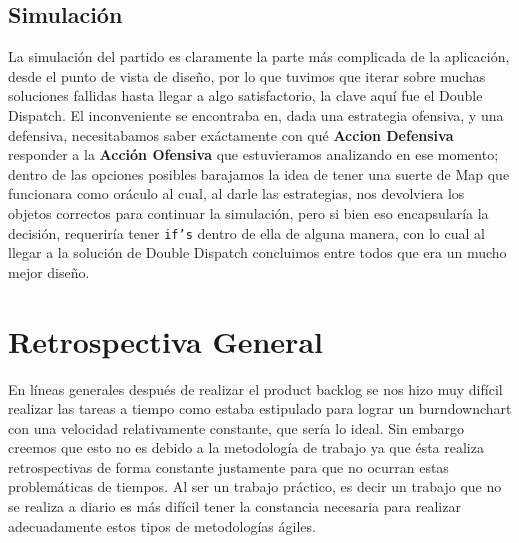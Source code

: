 \subsection{Simulación}

La simulación del partido es claramente la parte más complicada de la aplicación, desde el punto de vista de diseño, por lo que tuvimos que iterar sobre muchas soluciones fallidas hasta llegar a algo satisfactorio, la clave aquí fue el Double Dispatch. El inconveniente se encontraba en, dada una estrategia ofensiva, y una defensiva, necesitabamos saber exáctamente con qué \textbf{Accion Defensiva} responder a la \textbf{Acción Ofensiva} que estuvieramos analizando en ese momento; dentro de las opciones posibles barajamos la idea de tener una suerte de Map que funcionara como oráculo al cual, al darle las estrategias, nos devolviera los objetos correctos para continuar la simulación, pero si bien eso encapsularía la decisión, requeriría tener \texttt{if's} dentro de ella de alguna manera, con lo cual al llegar a la solución de Double Dispatch concluimos entre todos que era un mucho mejor diseño.


\section{Retrospectiva General}
En líneas generales después de realizar el product backlog se nos hizo muy difícil
realizar las tareas a tiempo como estaba estipulado para lograr un burndownchart
con una velocidad relativamente constante, que sería lo ideal. 
Sin embargo creemos que esto no es debido a la metodología de trabajo ya que 
ésta realiza retrospectivas de forma constante justamente para que 
no ocurran estas problemáticas de tiempos.
Al ser un trabajo práctico, es decir un trabajo que no se realiza a diario 
es más difícil tener la constancia necesaria
para realizar adecuadamente estos tipos de metodologías ágiles.
